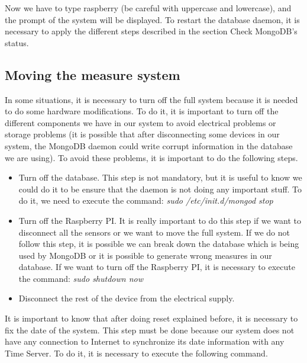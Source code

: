 Now we have to type raspberry (be careful with uppercase and lowercase), and the prompt of the system will be displayed.
To restart the database daemon, it is necessary to apply the different steps described in the section Check MongoDB’s status.

\subsection{Moving the measure system}

In some situations, it is necessary to turn off the full system because it is needed to do some hardware modifications. To do it, it is important to turn off the different components we have in our system to avoid electrical problems or storage problems (it is possible that after disconnecting some devices in our system, the MongoDB daemon could write corrupt information in the database we are using). To avoid these problems, it is important to do the following steps.

\begin{itemize}

\item Turn off the database. This step is not mandatory, but it is useful to know we could do it to be ensure that the daemon is not doing any important stuff. To do it, we need to execute the command:
\textit{sudo /etc/init.d/mongod stop}

\item Turn off the Raspberry PI. It is really important to do this step if we want to disconnect all the sensors or we want to move the full system. If we do not follow this step, it is possible we can break down the database which is being used by MongoDB or it is possible to generate wrong measures in our database. If we want to turn off the Raspberry PI, it is necessary to execute the command:
\textit{sudo shutdown now}

\item Disconnect the rest of the device from the electrical supply.

\end{itemize}

It is important to know that after doing reset explained before, it is necessary to fix the date of the system. This step must be done because our system does not have any connection to Internet to synchronize its date information with any Time Server. To do it, it is necessary to execute the following command.\\

